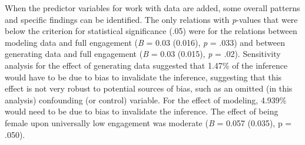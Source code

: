 \documentclass[]{msu-thesis}
\theoremstyle{definition}
\theoremstyle{definition}
\theoremstyle{definition}
\theoremstyle{remark}
\begin{document}
When the predictor variables for work with data are added, some overall
patterns and specific findings can be identified. The only relations
with \emph{p}-values that were below the criterion for statistical
significance (.05) were for the relations between modeling data and full
engagement (\emph{B} = 0.03 (0.016), \emph{p} = .033) and between
generating data and full engagement (\emph{B} = 0.03 (0.015), \emph{p} =
.02). Sensitivity analysis for the effect of generating data suggested
that 1.47\% of the inference would have to be due to bias to invalidate
the inference, suggesting that this effect is not very robust to
potential sources of bias, such as an omitted (in this analysis)
confounding (or control) variable. For the effect of modeling, 4.939\%
would need to be due to bias to invalidate the inference. The effect of
being female upon universally low engagement was moderate (\emph{B} =
0.057 (0.035), p = .050).
\end{document}
